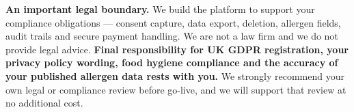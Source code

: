 \documentclass[11pt,a4paper]{article}
\begin{document}
\vspace{4pt}
\begin{warnbox}
\textbf{An important legal boundary.} We build the platform to support your compliance
obligations --- consent capture, data export, deletion, allergen fields, audit trails
and secure payment handling. We are not a law firm and we do not provide legal advice.
\textbf{Final responsibility for UK GDPR registration, your privacy policy wording, food
hygiene compliance and the accuracy of your published allergen data rests with you.} We
strongly recommend your own legal or compliance review before go-live, and we will
support that review at no additional cost.
\end{warnbox}

\end{document}

